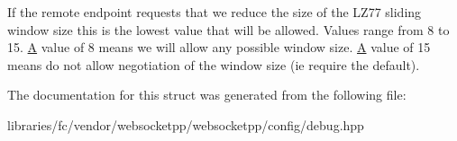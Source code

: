 If the remote endpoint requests that we reduce the size of the L\+Z77 sliding window size this is the lowest value that will be allowed. Values range from 8 to 15. \mbox{\hyperlink{struct_a}{A}} value of 8 means we will allow any possible window size. \mbox{\hyperlink{struct_a}{A}} value of 15 means do not allow negotiation of the window size (ie require the default). 

The documentation for this struct was generated from the following file\+:\begin{DoxyCompactItemize}
\item 
libraries/fc/vendor/websocketpp/websocketpp/config/debug.\+hpp\end{DoxyCompactItemize}
